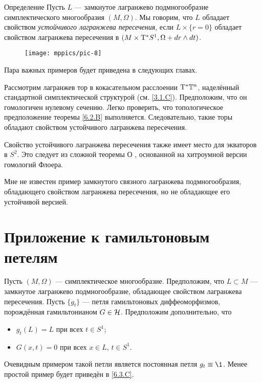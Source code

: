 \begin{ex}{Определение}\label{6.2.C}
Пусть $L$ — замкнутое лагранжево подмногообразие симплектического многообразия $(M, \Omega)$.
Мы говорим, что $L$ обладает свойством \emph{устойчивого лагранжева пересечения}, если $L \times \{r = 0\}$ обладает свойством лагранжева пересечения в $(M \times \mathrm{T}^\ast S^1, \Omega + d r \wedge d t)$.
\end{ex}


\begin{wrapfigure}{o}{25 mm}
\vskip-3mm
\centering
\texttt{[image: mppics/pic-8]}
\caption{}\label{pic-8}
\vskip0mm
\end{wrapfigure}


Пара важных примеров будет приведена в следующих главах.

\begin{ex}{}\label{6.2.D}
Рассмотрим лагранжев тор в кокасательном расслоении $\mathrm{T}^\ast \mathbb{T}^n$, наделённый стандартной симплектической структурой (см. \ref{3.1.C}).
Предположим, что он гомологичен нулевому сечению.
Легко проверить, что топологическое предположение теоремы \ref{6.2.B} выполняется.
Следовательно, такие торы обладают свойством устойчивого лагранжева пересечения.
\end{ex}




\begin{ex}[Экватор на $S^2$.]{}\label{6.2.E}
Свойство устойчивого лагранжева пересечения также имеет место для экваторов в $S^2$.
Это следует из сложной теоремы О \cite{O1,O2}, основанной на хитроумной версии гомологий Флоера.
\end{ex}


Мне не известен пример замкнутого связного лагранжева подмногообразия, обладающего свойством лагранжева пересечения, но не обладающее его устойчивой версией.


\section{Приложение к гамильтоновым петелям}

Пусть $(M, \Omega)$ — симплектическое многообразие.
Предположим, что $L \subset M$ — замкнутое лагранжево
подмногообразие, обладающее свойством 
лагранжева пересечения.  
Пусть $\{g_t\}$ — петля гамильтоновых диффеоморфизмов, порождённая
гамильтонианом $G \in \mathcal{H}$. 
Предположим дополнительно, что
\begin{itemize}
\item $g_t (L) = L$ при всех $t \in S^1$; 
\item $G (x, t) = 0$ при всех $x \in L$, $t \in S^1$.
\end{itemize}
Очевидным примером такой петли является постоянная петля $g_t \z\equiv \1$.
Менее простой пример будет приведён в \ref{6.3.C}.

